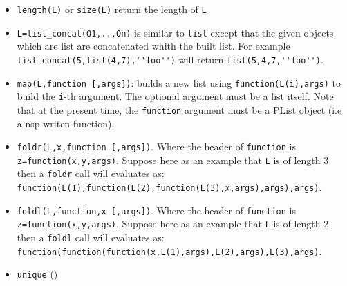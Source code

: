 \begin{itemize}
   \item \verb+length(L)+ or \verb+size(L)+ return the length of \verb+L+
   \item \verb+L=list_concat(O1,..,On)+ is similar to \verb+list+ except that 
     the given objects which are list are concatenated whith the built list. 
     For example \verb+list_concat(5,list(4,7),''foo'')+ will return 
     \verb+list(5,4,7,''foo'')+.
   \item \verb+map(L,function [,args])+: builds a new list using 
     \verb+function(L(i),args)+ to build the \verb+i+-th argument. 
     The optional argument must be a list itself. Note that at the present time,
     the \verb+function+ argument must be a PList object (i.e a nsp writen function).
   \item \verb+foldr(L,x,function [,args])+. Where the header of \verb+function+ is 
     \verb+z=function(x,y,args)+. Suppose here as an example that \verb+L+ is of 
     length 3 then a \verb+foldr+  call will evaluates as:
     \verb+function(L(1),function(L(2),function(L(3),x,args),args),args)+.
   \item \verb+foldl(L,function,x [,args])+. Where the header of \verb+function+ is 
     \verb+z=function(x,y,args)+. Suppose here as an example that \verb+L+ is of 
     length 2 then a \verb+foldl+  call will evaluates as:
     \verb+function(function(function(x,L(1),args),L(2),args),L(3),args)+.
   \item \verb+unique+ () 
\end{itemize}

